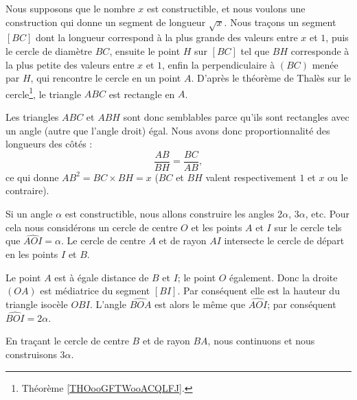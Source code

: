 \begin{example}  \label{ExTYMooSMCvSr}

	Nous supposons que le nombre \( x\) est constructible, et nous voulons une construction qui donne un segment de longueur \( \sqrt{x}\). Nous traçons un segment \( [BC]\) dont la longueur correspond à la plus grande des valeurs entre \( x\) et \( 1\), puis le cercle de diamètre \( BC\), ensuite le point \( H\) sur \( [BC]\) tel que \( BH\) corresponde à la plus petite des valeurs entre \( x\) et \( 1\), enfin la perpendiculaire à \( (BC)\) menée par \( H\), qui rencontre le cercle en un point \( A\). D'après le théorème de Thalès sur le cercle\footnote{Théorème \ref{THOooGFTWooACQLFJ}.}, le triangle \( ABC\) est rectangle en \( A\).

	Les triangles \( ABC\) et \( ABH\) sont donc semblables parce qu'ils sont rectangles avec un angle (autre que l'angle droit) égal. Nous avons donc proportionnalité des longueurs des côtés :
	\begin{equation}
		\frac{ AB }{ BH }=\frac{ BC }{ AB },
	\end{equation}
	ce qui donne \( AB^2=BC\times BH=x\) (\( BC\) et \( BH\) valent respectivement \( 1\) et \( x\) ou le contraire).

	\begin{center}
		
	\end{center}
\end{example}

\begin{example} \label{ExAHCooELGGPa}
	Si un angle \( \alpha\) est constructible, nous allons construire les angles \( 2\alpha\), \( 3\alpha\), etc. Pour cela nous considérons un cercle de centre \( O\) et les points \( A\) et \( I\) sur le cercle tels que \( \widehat{AOI}=\alpha\). Le cercle de centre \( A\) et de rayon \( AI\) intersecte le cercle de départ en les points \( I\) et \( B\).

	Le point \( A\) est à égale distance de \( B\) et \( I\); le point \( O\) également. Donc la droite \( (OA)\) est médiatrice du segment \( [BI]\). Par conséquent elle est la hauteur du triangle isocèle \( OBI\). L'angle \( \widehat{BOA}\) est alors le même que \( \widehat{AOI}\); par conséquent \( \widehat{BOI}=2\alpha\).

	\begin{center}
		
	\end{center}

	En traçant le cercle de centre \( B\) et de rayon \( BA\), nous continuons et nous construisons \( 3\alpha\).
\end{example}


